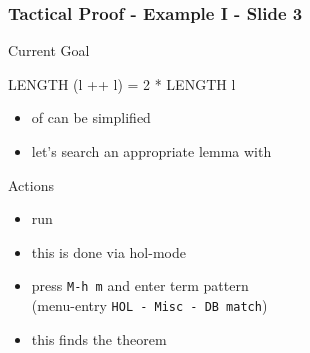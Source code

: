 \begin{frame}[fragile]
\frametitle{Tactical Proof - Example I - Slide 3}

\begin{block}{Current Goal}
\begin{semiverbatim}\small
LENGTH (l ++ l) = 2 * LENGTH l
\end{semiverbatim}
\end{block}

\begin{itemize}
\item {} of  can be simplified
\item let's search an appropriate lemma with 
\end{itemize}

\begin{block}{Actions}
\begin{itemize}
\item run 
\item this is done via hol-mode
\item press \texttt{M-h m} and enter term pattern\\
      (menu-entry \texttt{HOL - Misc - DB match})
\item this finds the theorem \\
\end{itemize}
\end{block}
\end{frame}



